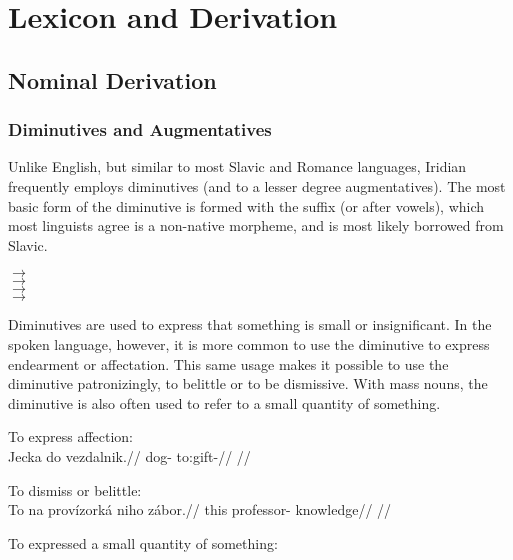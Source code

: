 \chapter{Lexicon and Derivation}

\section{Nominal Derivation}

\subsection{Diminutives and Augmentatives}\label{sec:diminutive}

Unlike English, but similar to most Slavic and Romance languages, Iridian frequently employs diminutives (and to a lesser degree augmentatives). The most basic form of the diminutive is formed with the suffix  (or  after vowels), which most linguists agree is a non-native morpheme, and is most likely borrowed from Slavic.

\ex
{} $\rightarrow$ \\
 $\rightarrow$  \\
 $\rightarrow$  \\
 $\rightarrow$  
\xe

Diminutives are used to express that something is small or insignificant. In the spoken language, however, it is more common to use the diminutive to express endearment or affectation. This same usage makes it possible to use the diminutive patronizingly, to belittle or to be dismissive. With mass nouns, the diminutive is also often used to refer to a small quantity of something.

\pex
\a To express affection:\\
\begingl
\gla Jecka do vezdalnik.//
\glb dog-  to:gift-//
\glft {}//
\endgl

\a To dismiss or belittle:\\
\begingl
\gla To na prov\'izork\'a niho z\'abor.//
\glb this  professor-  knowledge//
\glft {}//
\endgl

\a To expressed a small quantity of something:\\
\xe

